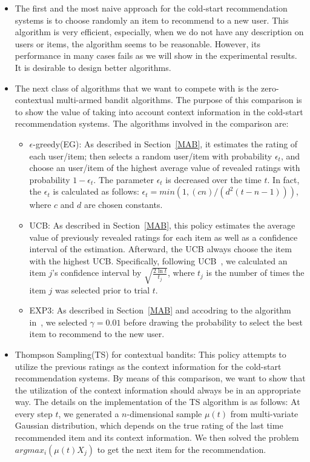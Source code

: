 \documentclass[twoside,leqno,twocolumn]{article}
\begin{document}
\begin{itemize}
\item The first and the most naive approach for the cold-start recommendation systems is to choose randomly an item to recommend to a new user. This algorithm is very efficient, especially, when we do not have any description on users or items, the algorithm seems to be reasonable. However, its performance in many cases fails as we will show in the experimental results. It is desirable to design better algorithms. 

\item The next class of algorithms that we want to compete with is the zero-contextual multi-armed bandit algorithms. The purpose of this comparison is to show the value of taking into account context information in the cold-start recommendation systems. The algorithms involved in the comparison are: 
\begin{itemize}
\item $\epsilon$-greedy(EG): As described in Section~\ref{MAB}, it estimates the rating of each user/item; then selects a random user/item with probability $\epsilon_{t}$, and choose an user/item of the highest average value of revealed ratings with probability $1-\epsilon_{t}$. The parameter $\epsilon_{t}$ is decreased over the time $t$. In fact, the $\epsilon_{t}$ is calculated as follows: $\epsilon_{t}=min(1,(cn)/(d^{2}(t-n-1)))$, where $c$ and $d$ are chosen constants.
\item UCB: As described in Section~\ref{MAB}, this policy estimates the average value of previously revealed ratings for each item as well as a confidence interval of the estimation. Afterward, the UCB always choose the item with the highest UCB. Specifically, following UCB~\cite{Auer:2002:FAM:599614.599677}, we calculated an item $j$'s confidence interval by $\sqrt{\frac{2\ln t}{t_j}}$, where $t_{j}$ is the number of times the item $j$ was selected prior to trial $t$.
\item EXP3: As described in Section~\ref{MAB} and accodring to the algorithm in~\cite{DBLP:journals/siamcomp/AuerCFS02}, we selected $\gamma=0.01$ before drawing the probability to select the best item to recommend to the new user.  
\end{itemize}

\item Thompson Sampling(TS) for contextual bandits: This policy attempts to utilize the previous ratings as the context information for the cold-start recommendation systems. By means of this comparison, we want to show that the utilization of the context information should always be in an appropriate way. The details on the implementation of the TS algorithm is as follows: At every step $t$, we generated a $n$-dimensional sample $\mu(t)$ from multi-variate Gaussian distribution, which depends on the true rating of the last time recommended item and its context information. We then solved the problem $argmax_{i}(\mu(t) X_{j})$ to get the next item for the recommendation.


\end{itemize}
\end{document}
